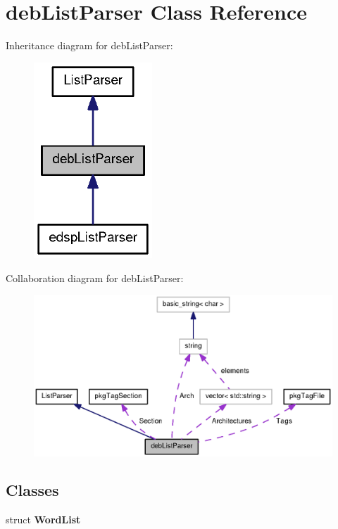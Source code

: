 \section{deb\-List\-Parser \-Class \-Reference}
\label{classdebListParser}


\-Inheritance diagram for deb\-List\-Parser\-:
\nopagebreak
\begin{figure}[H]
\begin{center}
\leavevmode
\includegraphics[width=126pt]{classdebListParser__inherit__graph}
\end{center}
\end{figure}


\-Collaboration diagram for deb\-List\-Parser\-:
\nopagebreak
\begin{figure}[H]
\begin{center}
\leavevmode
\includegraphics[width=350pt]{classdebListParser__coll__graph}
\end{center}
\end{figure}
\subsection*{\-Classes}
\begin{DoxyCompactItemize}
\item 
struct {\bf \-Word\-List}
\end{DoxyCompactItemize}
